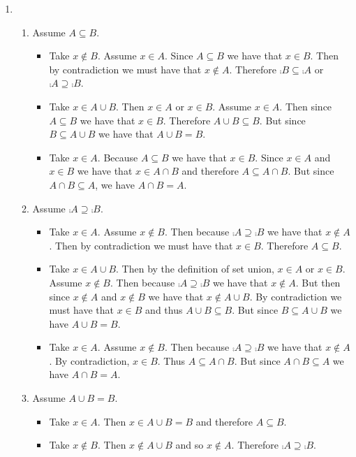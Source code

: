 \documentclass[12pt]{book}
\begin{document}
{\begin{enumerate}
\item \begin{enumerate}
		\item Assume $A \subseteq B$. 
		\begin{itemize}
			\item Take $x \notin B$. Assume $x \in A$. Since $A \subseteq B$ we have that $x \in B$. Then by contradiction we must have that $x \notin A$. Therefore $\comp{B} \subseteq \comp{A}$ or $\comp{A} \supseteq \comp{B}$.
			\item Take $x \in A \cup B$. Then $x \in A$ or $x \in B$. Assume $x \in A$. Then since $A \subseteq B$ we have that $x \in B$. Therefore $A \cup B \subseteq B$. But since $B \subseteq A \cup B$ we have that $A \cup B = B$.
			\item Take $x \in A$. Because $A \subseteq B$ we have that $x \in B$. Since $x \in A$ and $x \in B$ we have that $x \in A \cap B$ and therefore $A \subseteq A \cap B$. But since $A \cap B \subseteq A$, we have $A \cap B = A$.
		\end{itemize}
		\item Assume $\comp{A} \supseteq \comp{B}$.
		\begin{itemize}
		\item Take $x \in A$. Assume $x \notin B$. Then because $\comp{A} \supseteq \comp{B}$ we have that $x \notin A$. Then by contradiction we must have that $x \in B$. Therefore $A \subseteq B$.
		\item Take $x \in A \cup B$. Then by the definition of set union, $x \in A$ or $x \in B$. Assume $x \notin B$. Then because $\comp{A} \supseteq \comp{B}$ we have that $x \notin A$. But then since $x \notin A$ and $x \notin B$ we have that $x \notin A \cup B$. By contradiction we must have that $x \in B$ and thus $A \cup B \subseteq B$. But since $B \subseteq A \cup B$ we have $A \cup B = B$.
		\item Take $x \in A$. Assume $x \notin B$. Then because $\comp{A} \supseteq \comp{B}$ we have that $x \notin A$. By contradiction, $x \in B$. Thus $A \subseteq A \cap B$. But since $A \cap B \subseteq A$ we have $A \cap B = A$.
		\end{itemize}
		\item Assume $A \cup B = B$.
		\begin{itemize}
		\item Take $x \in A$. Then $x \in A \cup B = B$ and therefore $A \subseteq B$.
		\item Take $x \notin B$. Then $x \notin A \cup B$ and so $x \notin A$. Therefore $\comp{A} \supseteq \comp{B}$.

\end{itemize}
\end{enumerate}
\end{enumerate}}
\end{document}
